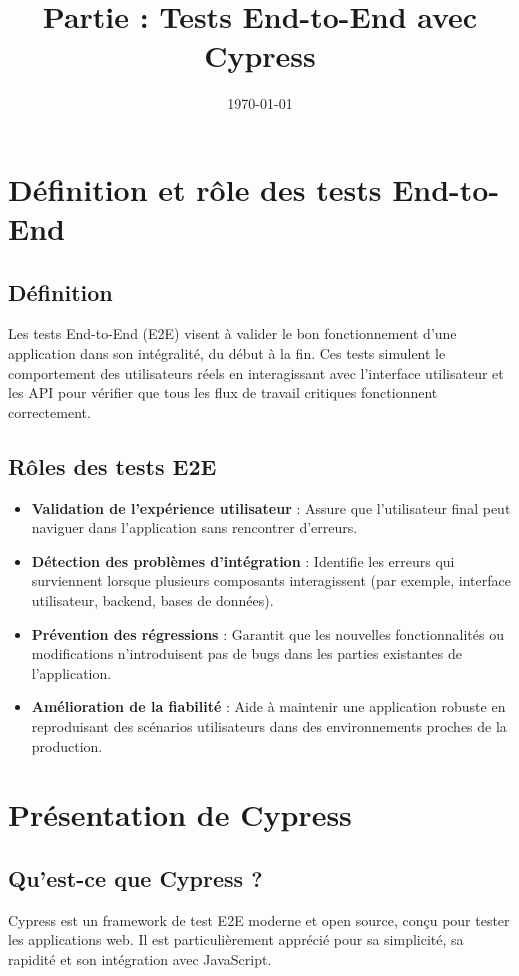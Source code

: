\documentclass[a4paper,12pt]{article}
\title{\textbf{Partie : Tests End-to-End avec Cypress}}
\author{}
\date{\today}
\begin{document}
\maketitle

\section*{Définition et rôle des tests End-to-End}

\subsection*{Définition}
Les tests End-to-End (E2E) visent à valider le bon fonctionnement d'une application dans son intégralité, du début à la fin. Ces tests simulent le comportement des utilisateurs réels en interagissant avec l'interface utilisateur et les API pour vérifier que tous les flux de travail critiques fonctionnent correctement.

\subsection*{Rôles des tests E2E}
\begin{itemize}
    \item \textbf{Validation de l'expérience utilisateur} : Assure que l'utilisateur final peut naviguer dans l'application sans rencontrer d'erreurs.
    \item \textbf{Détection des problèmes d'intégration} : Identifie les erreurs qui surviennent lorsque plusieurs composants interagissent (par exemple, interface utilisateur, backend, bases de données).
    \item \textbf{Prévention des régressions} : Garantit que les nouvelles fonctionnalités ou modifications n'introduisent pas de bugs dans les parties existantes de l'application.
    \item \textbf{Amélioration de la fiabilité} : Aide à maintenir une application robuste en reproduisant des scénarios utilisateurs dans des environnements proches de la production.
\end{itemize}

\section*{Présentation de Cypress}

\subsection*{Qu'est-ce que Cypress ?}
Cypress est un framework de test E2E moderne et open source, conçu pour tester les applications web. Il est particulièrement apprécié pour sa simplicité, sa rapidité et son intégration avec JavaScript.
\end{document}
